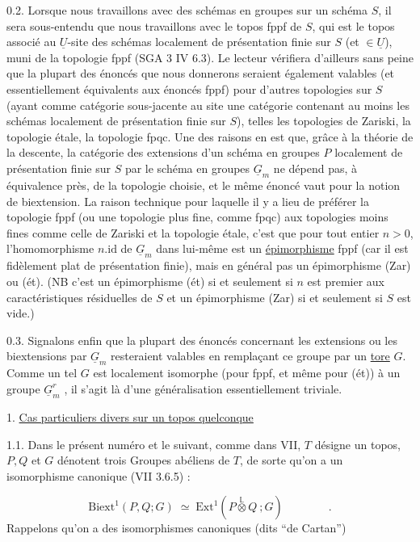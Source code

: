 0.2.  Lorsque nous travaillons avec des schémas en groupes sur un schéma $S$, il sera sous-entendu que nous travaillons avec le topos fppf de $S$, qui est le topos associé au $\underline{U}$-site des schémas localement de présentation finie sur $S$ (et $\in \underline{U}$), muni de la topologie fppf (SGA 3 IV 6.3). Le lecteur vérifiera d'ailleurs sans peine que la plupart des énoncés que nous donnerons seraient également valables (et essentiellement équivalents aux énoncés fppf) pour d'autres topologies sur $S$ (ayant comme catégorie sous-jacente au site une catégorie contenant au moins les schémas localement de présentation finie sur $S$), telles les topologies de Zariski, la topologie étale, la topologie fpqc. Une des raisons en est que, grâce à la théorie de la descente, la catégorie des extensions d'un schéma en groupes $P$ localement de présentation finie sur $S$ par le schéma en groupes $\underline{G}_m$ ne dépend pas, à équivalence près, de la topologie choisie, et le même énoncé vaut pour la notion de biextension. La raison technique pour laquelle il y a lieu de préférer la topologie fppf (ou une topologie plus fine, comme fpqc) aux topologies moins fines comme celle de Zariski et la topologie étale, c'est que pour tout entier $n > 0$, l'homomorphisme $n.\mathrm{id}$ de $\underline{G}_m$ dans lui-même est un \underline{épimorphisme} fppf (car il est fidèlement plat de présentation finie), mais en général pas un épimorphisme (Zar) ou (ét). (NB c'est un épimorphisme (ét) si et seulement si $n$ est premier aux caractéristiques résiduelles de $S$ et un épimorphisme (Zar) si et seulement si $S$ est vide.)



0.3.  Signalons enfin que la plupart des énoncés concernant les extensions ou les biextensions par $\underline{G}_m$ resteraient valables en remplaçant ce groupe par un \underline{tore} $G$. Comme un tel $G$ est localement isomorphe (pour fppf, et même pour (ét)) à un groupe $\underline{G}_m^r$ , il s'agit là d'une généralisation essentiellement triviale.


1. \underline{Cas particuliers divers sur un topos quelconque}

1.1.  Dans le présent numéro et le suivant, comme dans VII, $T$ désigne un topos, $P,Q$ et $G$ dénotent trois Groupes abéliens de $T$, de sorte qu'on a un isomorphisme canonique (VII 3.6.5) :

\begin{equation}\tag{1.1.1}
\mathrm{Biext}^1(P,Q;G) \;\simeq\; \mathrm{Ext}^1(P\overset{\mathbb{L}}{\otimes}Q\ ;G) \qquad\qquad .
\end{equation}
Rappelons qu'on a des isomorphismes canoniques (dits ``de Cartan'')

